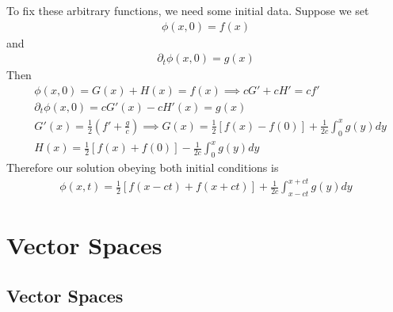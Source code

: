 \documentclass[a4paper]{article}
\begin{document}
To fix these arbitrary functions, we need some initial data. Suppose we set
\begin{equation*}
\begin{aligned}
\phi\left(x,0\right) = f\left(x\right)
\end{aligned}
\end{equation*}
and
\begin{equation*}
\begin{aligned}
\partial_t \phi\left(x,0\right)=g\left(x\right)
\end{aligned}
\end{equation*}
Then
\begin{equation*}
\begin{aligned}
&\phi\left(x,0\right) = G\left(x\right)+H\left(x\right) = f\left(x\right) \implies cG'+cH'=cf'\\
&\partial_t \phi\left(x,0\right) = cG'\left(x\right) - cH'\left(x\right) = g\left(x\right)\\
&G'\left(x\right) = \frac{1}{2}\left(f'+\frac{g}{c}\right) \implies G\left(x\right) = \frac{1}{2}\left[f\left(x\right)-f\left(0\right)\right] + \frac{1}{2c}\int_0^x g\left(y\right)dy\\
&H\left(x\right) = \frac{1}{2} \left[f\left(x\right)+f\left(0\right)\right] - \frac{1}{2c}\int_0^x g\left(y\right)dy
\end{aligned}
\end{equation*}
Therefore our solution obeying both initial conditions is
\begin{equation*}
\begin{aligned}
\phi\left(x,t\right)=\frac{1}{2}\left[f\left(x-ct\right)+f\left(x+ct\right)\right] + \frac{1}{2c}\int_{x-ct}^{x+ct} g\left(y\right)dy
\end{aligned}
\end{equation*}

\newpage

\section{Vector Spaces}

\subsection{Vector Spaces}
\end{document}
